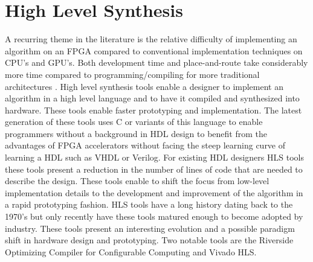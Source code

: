 

\chapter{High Level Synthesis}

A recurring theme in the literature is the relative difficulty of implementing an algorithm on an FPGA compared to conventional implementation techniques on CPU's and GPU's. Both development time and place-and-route take considerably more time compared to programming/compiling for more traditional architectures \cite{inta_chimera:_2012,tsoi_axel:_2010}.
High level synthesis tools enable a designer to implement an algorithm in a high level language and to have it compiled and synthesized into hardware. These tools enable faster prototyping and implementation\cite{che_accelerating_2008}. The latest generation of these tools uses C or variants of this language to enable programmers without a background in HDL design to benefit from the advantages of FPGA accelerators without facing the steep learning curve of learning a HDL such as VHDL or Verilog. For existing HDL designers HLS tools these tools present a reduction in the number of lines of code that are needed to describe the design\cite{casseau_c-_2005}.  These tools enable to shift the focus from low-level implementation details to the development and improvement of the algorithm in a rapid prototyping fashion\cite{wakabayashi_c-based_2004}.
HLS tools have a long history dating back to the 1970's but only recently have these tools matured enough to become adopted by industry. These tools present an interesting evolution and a possible paradigm shift in hardware design and prototyping\cite{cong_high-level_2011}.
Two notable tools are the Riverside Optimizing Compiler for Configurable Computing and Vivado HLS.

